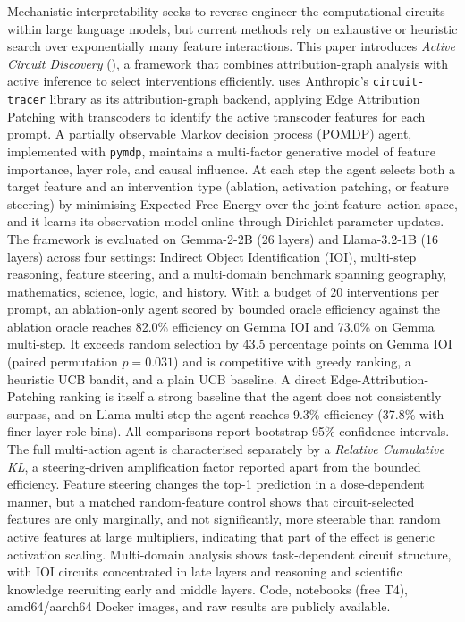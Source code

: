 Mechanistic interpretability seeks to reverse-engineer the computational
circuits within large language models, but current methods rely on exhaustive
or heuristic search over exponentially many feature interactions. This paper
introduces \emph{Active Circuit Discovery} (\ACD{}), a framework that combines
attribution-graph analysis with active inference to select interventions
efficiently. \ACD{} uses Anthropic's \texttt{circuit-tracer} library as its
attribution-graph backend, applying Edge Attribution Patching with transcoders
to identify the active transcoder features for each prompt. A partially
observable Markov decision process (POMDP) agent, implemented with
\texttt{pymdp}, maintains a multi-factor generative model of feature
importance, layer role, and causal influence. At each step the agent selects
both a target feature and an intervention type (ablation, activation patching,
or feature steering) by minimising Expected Free Energy over the joint
feature--action space, and it learns its observation model online through
Dirichlet parameter updates.  The framework is
evaluated on Gemma-2-2B (26 layers) and Llama-3.2-1B (16 layers) across four
settings: Indirect Object Identification (IOI), multi-step reasoning, feature
steering, and a multi-domain benchmark spanning geography, mathematics,
science, logic, and history. With a budget of 20 interventions per prompt, an
ablation-only agent scored by bounded oracle efficiency against the ablation
oracle reaches 82.0\% efficiency on Gemma IOI and 73.0\% on Gemma multi-step.
It exceeds random selection by 43.5 percentage points on Gemma IOI (paired
permutation $p=0.031$) and is competitive with greedy ranking, a heuristic UCB
bandit, and a plain UCB baseline. A direct Edge-Attribution-Patching ranking is
itself a strong baseline that the agent does not consistently surpass, and on
Llama multi-step the agent reaches 9.3\% efficiency (37.8\% with finer
layer-role bins). All comparisons report bootstrap 95\% confidence intervals.
The full multi-action agent is characterised separately by a \emph{Relative
Cumulative KL}, a steering-driven amplification factor reported apart from the
bounded efficiency. Feature steering changes the top-1 prediction in a
dose-dependent manner, but a matched random-feature control shows that
circuit-selected features are only marginally, and not significantly, more
steerable than random active features at large multipliers, indicating that
part of the effect is generic activation scaling. Multi-domain analysis shows
task-dependent circuit structure, with IOI circuits concentrated in late layers
and reasoning and scientific knowledge recruiting early and middle layers. Code,
notebooks (free T4), amd64/aarch64 Docker images, and raw results are publicly
available.
